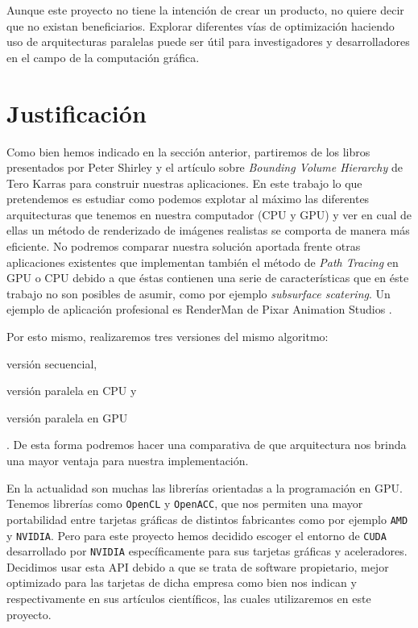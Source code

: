 \documentclass[titlepage,12pt]{report}
\begin{document}
Aunque este proyecto no tiene la intención de crear un producto, no quiere decir que no existan beneficiarios. Explorar diferentes vías de optimización haciendo uso de arquitecturas paralelas puede ser útil para investigadores y desarrolladores en el campo de la computación gráfica.

\section{Justificación}

Como bien hemos indicado en la sección anterior, partiremos de los libros presentados por Peter Shirley y el artículo sobre \textit{Bounding Volume Hierarchy} de Tero Karras para construir nuestras aplicaciones. En este trabajo lo que pretendemos es estudiar como podemos explotar al máximo las diferentes arquitecturas que tenemos en nuestra computador (CPU y GPU) y ver en cual de ellas un método de renderizado de imágenes realistas se comporta de manera más eficiente. No podremos comparar nuestra solución aportada frente otras aplicaciones existentes que implementan también el método de \textit{Path Tracing} en GPU o CPU debido a que éstas contienen una serie de características que en éste trabajo no son posibles de asumir, como por ejemplo \textit{subsurface scatering}. Un ejemplo de aplicación profesional es RenderMan de Pixar Animation Studios \citep{Christensen2018}.

Por esto mismo, realizaremos tres versiones del mismo algoritmo: \begin{enumerate*}[label=\roman*)] \item versión secuencial, \item versión paralela en CPU y \item versión paralela en GPU \end{enumerate*}. De esta forma podremos hacer una comparativa de que arquitectura nos brinda una mayor ventaja para nuestra implementación.

En la actualidad son muchas las librerías orientadas a la programación en GPU. Tenemos librerías como \texttt{OpenCL} y \texttt{OpenACC}, que nos permiten una mayor portabilidad entre tarjetas gráficas de distintos fabricantes como por ejemplo \texttt{AMD} y \texttt{NVIDIA}. Pero para este proyecto hemos decidido escoger el entorno de \texttt{CUDA} desarrollado por \texttt{NVIDIA} específicamente para sus tarjetas gráficas y aceleradores. Decidimos usar esta API debido a que se trata de software propietario, mejor optimizado para las tarjetas de dicha empresa como bien nos indican \citep{Karimi2010} y \citep{Fang2011} respectivamente en sus artículos científicos, las cuales utilizaremos en este proyecto.
\end{document}
